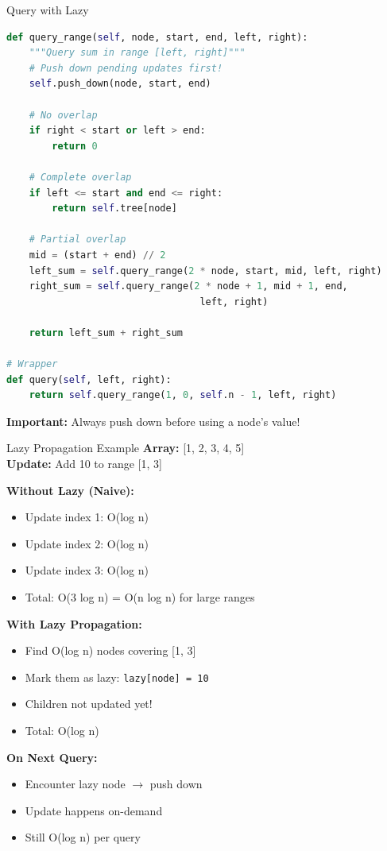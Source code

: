 \documentclass[aspectratio=169]{beamer}
\begin{document}
\begin{frame}[fragile]{Query with Lazy}
  \begin{lstlisting}[language=Python, basicstyle=\ttfamily\footnotesize]
def query_range(self, node, start, end, left, right):
    """Query sum in range [left, right]"""
    # Push down pending updates first!
    self.push_down(node, start, end)

    # No overlap
    if right < start or left > end:
        return 0

    # Complete overlap
    if left <= start and end <= right:
        return self.tree[node]

    # Partial overlap
    mid = (start + end) // 2
    left_sum = self.query_range(2 * node, start, mid, left, right)
    right_sum = self.query_range(2 * node + 1, mid + 1, end,
                                  left, right)

    return left_sum + right_sum

# Wrapper
def query(self, left, right):
    return self.query_range(1, 0, self.n - 1, left, right)
  \end{lstlisting}

  \vspace{0.3cm}
  \textbf{Important:} Always push down before using a node's value!
\end{frame}

\begin{frame}{Lazy Propagation Example}
  \textbf{Array:} [1, 2, 3, 4, 5]\\
  \textbf{Update:} Add 10 to range [1, 3]

  \vspace{0.5cm}
  \textbf{Without Lazy (Naive):}
  \begin{itemize}
    \item Update index 1: O(log n)
    \item Update index 2: O(log n)
    \item Update index 3: O(log n)
    \item Total: O(3 log n) = O(n log n) for large ranges
  \end{itemize}

  \vspace{0.5cm}
  \textbf{With Lazy Propagation:}
  \begin{itemize}
    \item Find O(log n) nodes covering [1, 3]
    \item Mark them as lazy: \texttt{lazy[node] = 10}
    \item Children not updated yet!
    \item Total: O(log n)
  \end{itemize}

  \vspace{0.5cm}
  \textbf{On Next Query:}
  \begin{itemize}
    \item Encounter lazy node $\rightarrow$ push down
    \item Update happens on-demand
    \item Still O(log n) per query
  \end{itemize}
\end{frame}
\end{document}
